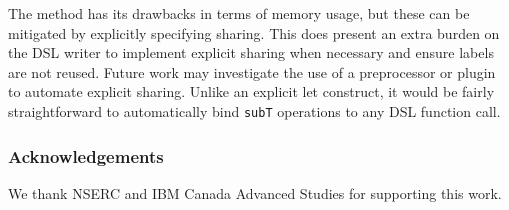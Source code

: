 \documentclass[runningheads]{llncs}
\begin{document}
The method has its drawbacks in terms of memory usage, but these can be
mitigated by explicitly specifying sharing. This does present an extra burden on
the DSL writer to implement explicit sharing when necessary and ensure labels
are not reused. Future work may investigate the use of a preprocessor or plugin
to automate explicit sharing. Unlike an explicit let construct, it would be
fairly straightforward to automatically bind \texttt{subT}
operations to any DSL function call.

\subsubsection{Acknowledgements} We thank NSERC and IBM Canada Advanced Studies for supporting this work.
%
%


\end{document}

